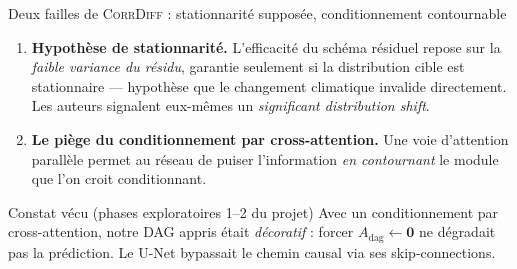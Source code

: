 \documentclass[aspectratio=169,10pt]{beamer}
\newcommand{\CorrDiff}{\textsc{CorrDiff}}
\newcommand{\Adag}{A_{\mathrm{dag}}}
\begin{document}
\begin{frame}{Deux failles de \CorrDiff{} : stationnarité supposée, conditionnement contournable}
  \begin{enumerate}
    \item \textbf{Hypothèse de stationnarité.} L'efficacité du schéma résiduel repose sur la
          \emph{faible variance du résidu}, garantie seulement si la distribution cible est
          stationnaire --- hypothèse que le changement climatique invalide directement.
          Les auteurs signalent eux-mêmes un \emph{significant distribution shift}.
    \item \textbf{Le piège du conditionnement par cross-attention.} Une voie d'attention
          parallèle permet au réseau de puiser l'information \emph{en contournant} le
          module que l'on croit conditionnant.
  \end{enumerate}
  \vspace{0.2cm}
  \begin{alertblock}{Constat vécu (phases exploratoires 1--2 du projet)}
    \small Avec un conditionnement par cross-attention, notre DAG appris était
    \emph{décoratif} : forcer $\Adag \leftarrow \mathbf{0}$ ne dégradait pas la
    prédiction. Le U-Net bypassait le chemin causal via ses skip-connections.
  \end{alertblock}
\end{frame}
\end{document}
